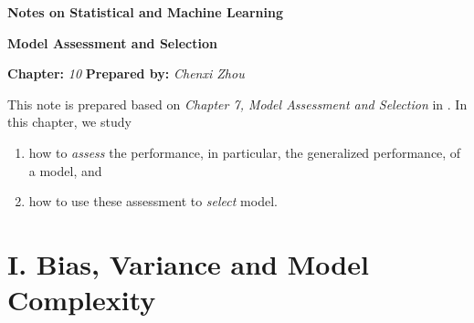 \documentclass[12pt]{article}
\newcommand{\titlebox}[4]{
\begin{tcolorbox}[colback = blue!5!white!95, colframe = blue!70!black
]
  \noindent \textbf{ #1 } \hfill \textit{#2} 
  \begin{center}
  	 \LARGE{\textbf{#3}}
  \end{center}
\textbf{Chapter:} \textit{#4} \hfill \textbf{Prepared by:} \textit{Chenxi Zhou}
\end{tcolorbox}
}
\begin{document}
\titlebox{Notes on Statistical and Machine Learning}{}{Model Assessment and Selection}{10}
\thispagestyle{plain}

\vspace{10pt}

This note is prepared based on \textit{Chapter 7, Model Assessment and Selection} in \textcite{Friedman2001-np}. In this chapter, we study 
\begin{enumerate}
	\item how to \emph{assess} the performance, in particular, the generalized performance, of a model, and 
	\item how to use these assessment to \emph{select} model. 
\end{enumerate}


\section*{I. Bias, Variance and Model Complexity} 
\end{document}
